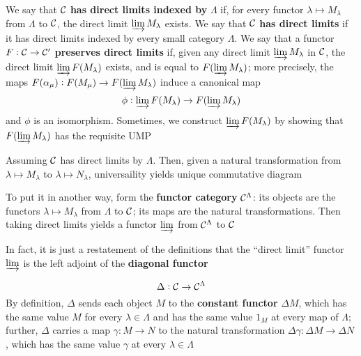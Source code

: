 \documentclass[11pt]{article}
\begin{document}
We say that \(\mathcal{C}\) \textbf{has direct limits indexed by} \(\Lambda\) if, for every
functor \(\lambda\mapsto M_\lambda\) from \(\Lambda\) to \(\mathcal{C}\), the direct limit
\(\varinjlim M_\lambda\) exists. We say that \(\mathcal{C}\) \textbf{has direct limits} if
it has direct limits indexed by every small category \(\Lambda\). We say that a functor
\(F:\mathcal{C}\to\mathcal{C}'\) \textbf{preserves direct limits} if, given any direct limit
\(\varinjlim M_\lambda\) in \(\mathcal{C}\), the direct limit \(\varinjlim
   F(M_\lambda)\) exists, and is equal to \(F(\varinjlim M_\lambda)\); more
precisely, the maps \(F(\alpha_\mu):F(M_\mu)\to F(\varinjlim M_\lambda)\)
induce a canonical map
\begin{equation*}
\phi:\varinjlim F(M_\lambda)\to F(\varinjlim M_\lambda)
\end{equation*}
and \(\phi\) is an isomorphism. Sometimes, we construct \(\varinjlim F(M_\lambda)\)
by showing that \(F(\varinjlim M_\lambda)\) has the requisite UMP

Assuming \(\mathcal{C}\) has direct limits by \(\Lambda\). Then, given a natural
transformation from \(\lambda\mapsto M_\lambda\) to \(\lambda\mapsto
   N_\lambda\), universaility yields unique commutative diagram
\begin{center}
\end{center}

To put it in another way, form the \textbf{functor category} \(\mathcal{C}^\Lambda\): its
objects are the functors \(\lambda\mapsto M_\lambda\) from \(\Lambda\) to
\(\mathcal{C}\); its maps are the natural transformations. Then taking direct
limits yields a functor \(\varinjlim\) from \(\mathcal{C}^\Lambda\) to \(\mathcal{C}\)

In fact, it is just a restatement of the definitions that the ``direct limit''
functor \(\varinjlim\) is the left adjoint of the \textbf{diagonal functor}

\begin{equation*}
\Delta:\mathcal{C}\to\mathcal{C}^\Lambda
\end{equation*}
By definition, \(\Delta\) sends each object \(M\) to the \textbf{constant functor}
\(\Delta M\), which has the same value \(M\) for every \(\lambda\in\Lambda\) and
has the same value \(1_M\) at every map of \(\Lambda\); further, \(\Delta\) carries a map
\(\gamma:M\to N\) to the natural transformation \(\Delta\gamma:\Delta M\to \Delta N\), which
has the same value \(\gamma\) at every \(\lambda\in\Lambda\)
\end{document}
